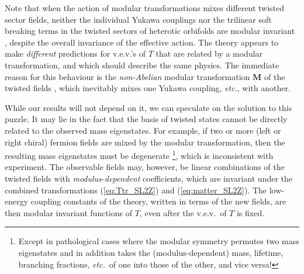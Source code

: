 \documentclass[a4paper,12pt]{article}
\begin{document}
Note that when the action of modular transformations mixes different twisted sector fields, neither the individual Yukawa couplings nor the trilinear soft breaking terms in the twisted sectors of heterotic orbifolds are modular invariant \cite{Bailin:1998iz+97,mythesis}, despite the overall invariance of the effective action. The theory appears to make {\em different}\/ predictions for v.e.v.'s of $T$ that are related by a modular transformation, and which should describe the same physics. The immediate reason for this behaviour is the {\em non-Abelian}\/ modular transformation $\mathbf{M}$ of the twisted fields \cite{FerraraLT,LauerMN91}, which inevitably mixes one Yukawa coupling, {\em etc.}\/, with another.

While our results will not depend on it, we can speculate on the solution to this puzzle. It may lie in the fact that the basis of twisted states cannot be directly related to the observed mass eigenstates. For example, if two or more (left or right chiral) fermion fields are mixed by the modular transformation, then the resulting mass eigenstates must be degenerate \cite{mythesis}\footnote{Except in pathological cases where the modular symmetry permutes two mass eigenstates and in addition takes the (modulus-dependent) mass, lifetime, branching fractions, {\em etc.\/}\ of one into those of the other, and vice versa!}, which is inconsistent with experiment. The observable fields may, however, be linear combinations of the twisted fields with {\em modulus-dependent}\/ coefficients, which are invariant under the combined transformations (\ref{eq:Ttr_SL2Z}) and (\ref{eq:matter_SL2Z}). The low-energy coupling constants of the theory, written in terms of the new fields, are then modular invariant functions of $T$, even after the v.e.v.\ of $T$ is fixed.
\end{document}
